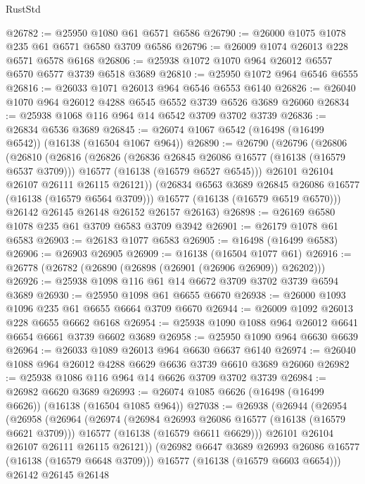 \begin{lexlean}{RustStd}
\begin{coremodule}
@26782 := @25950 @1080 @61 @6571 @6586
@26790 := @26000 @1075 @1078 @235 @61 @6571 @6580 @3709 @6586
@26796 := @26009 @1074 @26013 @228 @6571 @6578 @6168
@26806 := @25938 @1072 @1070 @964 @26012 @6557 @6570 @6577 @3739 @6518 @3689
@26810 := @25950 @1072 @964 @6546 @6555
@26816 := @26033 @1071 @26013 @964 @6546 @6553 @6140
@26826 := @26040 @1070 @964 @26012 @4288 @6545 @6552 @3739 @6526 @3689 @26060
@26834 := @25938 @1068 @116 @964 @14 @6542 @3709 @3702 @3739
@26836 := @26834 @6536 @3689
@26845 := @26074 @1067 @6542 (@16498 (@16499 @6542)) (@16138 (@16504 @1067 @964))
@26890 := @26790
    (@26796
      (@26806
        (@26810
          (@26816
            (@26826
              (@26836 @26845 @26086 @16577 (@16138 (@16579 @6537 @3709)))
              @16577
              (@16138 (@16579 @6527 @6545)))
            @26101
            @26104
            @26107
            @26111
            @26115
            @26121))
        (@26834 @6563 @3689 @26845 @26086 @16577 (@16138 (@16579 @6564 @3709)))
        @16577
        (@16138 (@16579 @6519 @6570)))
      @26142
      @26145
      @26148
      @26152
      @26157
      @26163)
@26898 := @26169 @6580 @1078 @235 @61 @3709 @6583 @3709 @3942
@26901 := @26179 @1078 @61 @6583
@26903 := @26183 @1077 @6583
@26905 := @16498 (@16499 @6583)
@26906 := @26903 @26905
@26909 := @16138 (@16504 @1077 @61)
@26916 := @26778 (@26782 (@26890 (@26898 (@26901 (@26906 @26909)) @26202)))
@26926 := @25938 @1098 @116 @61 @14 @6672 @3709 @3702 @3739 @6594 @3689
@26930 := @25950 @1098 @61 @6655 @6670
@26938 := @26000 @1093 @1096 @235 @61 @6655 @6664 @3709 @6670
@26944 := @26009 @1092 @26013 @228 @6655 @6662 @6168
@26954 := @25938 @1090 @1088 @964 @26012 @6641 @6654 @6661 @3739 @6602 @3689
@26958 := @25950 @1090 @964 @6630 @6639
@26964 := @26033 @1089 @26013 @964 @6630 @6637 @6140
@26974 := @26040 @1088 @964 @26012 @4288 @6629 @6636 @3739 @6610 @3689 @26060
@26982 := @25938 @1086 @116 @964 @14 @6626 @3709 @3702 @3739
@26984 := @26982 @6620 @3689
@26993 := @26074 @1085 @6626 (@16498 (@16499 @6626)) (@16138 (@16504 @1085 @964))
@27038 := @26938
    (@26944
      (@26954
        (@26958
          (@26964
            (@26974
              (@26984 @26993 @26086 @16577 (@16138 (@16579 @6621 @3709)))
              @16577
              (@16138 (@16579 @6611 @6629)))
            @26101
            @26104
            @26107
            @26111
            @26115
            @26121))
        (@26982 @6647 @3689 @26993 @26086 @16577 (@16138 (@16579 @6648 @3709)))
        @16577
        (@16138 (@16579 @6603 @6654)))
      @26142
      @26145
      @26148

\end{coremodule}
\end{lexlean}

